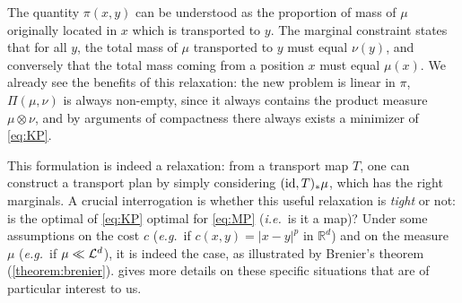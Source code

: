         \begin{remark}
            The quantity $\pi(x, y)$ can be understood as the proportion of mass of $\mu$ originally located in $x$ which is transported to $y$. The marginal constraint states that for all $y$, the total mass of $\mu$ transported to $y$ must equal $\nu(y)$, and conversely that the total mass coming from a position $x$ must equal $\mu(x)$.
            We already see the benefits of this relaxation: the new problem is linear in $\pi$, $\Pi(\mu,\nu)$ is always non-empty, since it always contains the product measure $\mu\otimes\nu$, and by arguments of compactness there always exists a minimizer of \cref{eq:KP}.
        \end{remark}

        This formulation is indeed a relaxation: from a transport map $T$, one can construct a transport plan by simply considering $(\operatorname{id},T)_*\mu$, which has the right marginals. A crucial interrogation is whether this useful relaxation is \emph{tight} or not: is the optimal of \cref{eq:KP} optimal for \cref{eq:MP} (\textit{i.e.}~is it a map)? Under some assumptions on the cost $c$ (\textit{e.g.}~if $c(x,y)=|x-y|^p$ in $\mathbb{R}^d$) and on the measure $\mu$ (\textit{e.g.}~if $\mu\ll\mathcal{L}^d$), it is indeed the case, as illustrated by Brenier's theorem (\cref{theorem:brenier}).  gives more details on these specific situations that are of particular interest to us.

